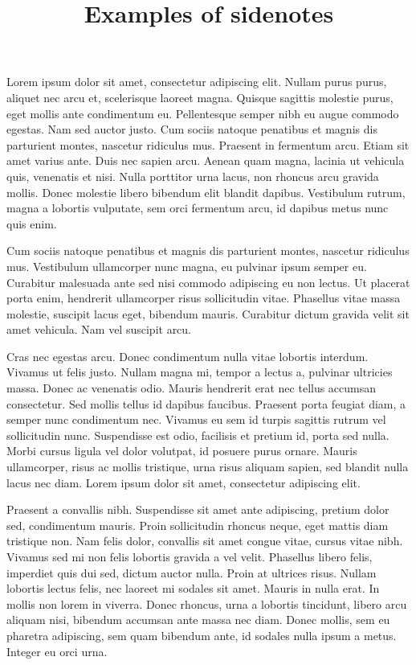 \documentclass{book}
\begin{document}
\title{Examples of sidenotes}
\maketitle
\beginnumbering


\pstart {}Lorem ipsum dolor sit amet, consectetur adipiscing elit. Nullam purus purus, aliquet nec arcu et, scelerisque laoreet magna. Quisque sagittis molestie purus, eget mollis ante condimentum eu. Pellentesque semper nibh eu augue commodo egestas. Nam sed auctor justo. Cum sociis natoque penatibus et magnis dis parturient montes, nascetur ridiculus mus. Praesent in fermentum arcu. Etiam sit amet varius ante. Duis nec sapien arcu. Aenean quam magna, lacinia ut vehicula quis, venenatis et nisi. Nulla porttitor urna lacus, non rhoncus arcu gravida mollis. Donec molestie libero bibendum elit blandit dapibus. Vestibulum rutrum, magna a lobortis vulputate, sem orci fermentum arcu, id dapibus metus nunc quis enim.
\pend

\pstart Cum sociis natoque penatibus et magnis dis parturient montes, nascetur ridiculus mus. Vestibulum ullamcorper nunc magna, eu pulvinar ipsum semper eu. Curabitur malesuada ante sed nisi commodo adipiscing eu non lectus. Ut placerat porta enim, hendrerit ullamcorper risus sollicitudin vitae. Phasellus vitae massa molestie, suscipit lacus eget, bibendum mauris. Curabitur dictum gravida velit sit amet vehicula. Nam vel suscipit arcu.
\pend

\pstart Cras nec egestas arcu. Donec condimentum nulla vitae lobortis interdum. Vivamus ut felis justo. Nullam magna mi, tempor a lectus a, pulvinar ultricies massa. Donec ac venenatis odio. Mauris hendrerit erat nec tellus accumsan consectetur. Sed mollis tellus id dapibus faucibus. Praesent porta feugiat diam, a semper nunc condimentum nec. Vivamus eu sem id turpis sagittis rutrum vel sollicitudin nunc. Suspendisse est odio, facilisis et pretium id, porta sed nulla. Morbi cursus ligula vel dolor volutpat, id posuere purus ornare. Mauris ullamcorper, risus ac mollis tristique, urna risus aliquam sapien, sed blandit nulla lacus nec diam. Lorem ipsum dolor sit amet, consectetur adipiscing elit.
\pend

\pstart Praesent a convallis nibh. Suspendisse sit amet ante adipiscing, pretium dolor sed, condimentum mauris. Proin sollicitudin rhoncus neque, eget mattis diam tristique non. Nam felis dolor, convallis sit amet congue vitae, cursus vitae nibh. Vivamus sed mi non felis lobortis gravida a vel velit. Phasellus libero felis, imperdiet quis dui sed, dictum auctor nulla. Proin at ultrices risus. Nullam lobortis lectus felis, nec laoreet mi sodales sit amet. Mauris in nulla erat. In mollis non lorem in viverra. Donec rhoncus, urna a lobortis tincidunt, libero arcu aliquam nisi, bibendum accumsan ante massa nec diam. Donec mollis, sem eu pharetra adipiscing, sem quam bibendum ante, id sodales nulla ipsum a metus. Integer eu orci urna.
\pend
\end{document}
